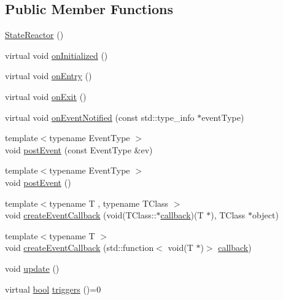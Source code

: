 \subsection*{Public Member Functions}
\begin{DoxyCompactItemize}
\item 
\hyperlink{classsmacc_1_1StateReactor_ae319e9f7b0a2a80b4c5ace6ec8c99fb2}{State\+Reactor} ()
\item 
virtual void \hyperlink{classsmacc_1_1StateReactor_aa10b2c6b7d1e80f01b00cbdac526a2bf}{on\+Initialized} ()
\item 
virtual void \hyperlink{classsmacc_1_1StateReactor_a11ed02721fd751b8272540645b88f4a6}{on\+Entry} ()
\item 
virtual void \hyperlink{classsmacc_1_1StateReactor_ace125d986cc787c3940306b90bb67f07}{on\+Exit} ()
\item 
virtual void \hyperlink{classsmacc_1_1StateReactor_a17646b3c68a6d80d1e4da8c14238ce36}{on\+Event\+Notified} (const std\+::type\+\_\+info $\ast$event\+Type)
\item 
{\footnotesize template$<$typename Event\+Type $>$ }\\void \hyperlink{classsmacc_1_1StateReactor_a06303bdf908d04d5a6eb5f63131e68bd}{post\+Event} (const Event\+Type \&ev)
\item 
{\footnotesize template$<$typename Event\+Type $>$ }\\void \hyperlink{classsmacc_1_1StateReactor_a3d149851c5540110a29e9a7b3228239d}{post\+Event} ()
\item 
{\footnotesize template$<$typename T , typename T\+Class $>$ }\\void \hyperlink{classsmacc_1_1StateReactor_a68482e08f6449694a0bcda843b14b376}{create\+Event\+Callback} (void(T\+Class\+::$\ast$\hyperlink{3_2servers_2opencv__perception__node_2opencv__perception__node_8cpp_a050e697bd654facce10ea3f6549669b3}{callback})(T $\ast$), T\+Class $\ast$object)
\item 
{\footnotesize template$<$typename T $>$ }\\void \hyperlink{classsmacc_1_1StateReactor_ac6b3a604009e5a68123aed27e70cf2be}{create\+Event\+Callback} (std\+::function$<$ void(T $\ast$)$>$ \hyperlink{3_2servers_2opencv__perception__node_2opencv__perception__node_8cpp_a050e697bd654facce10ea3f6549669b3}{callback})
\item 
void \hyperlink{classsmacc_1_1StateReactor_aca5d4f7af06532272db55943b7810a43}{update} ()
\item 
virtual \hyperlink{classbool}{bool} \hyperlink{classsmacc_1_1StateReactor_a445bc3c90980d75d7d815b85cfb68b21}{triggers} ()=0

\end{DoxyCompactItemize}
